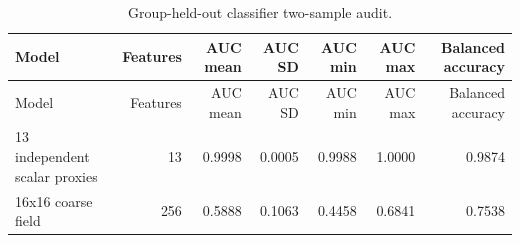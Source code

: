 \scriptsize
\setlength{\tabcolsep}{2pt}
\begin{longtable}{p{}rrrrrr}
\caption{Group-held-out classifier two-sample audit.}\label{tab:c2st}\\
\toprule
Model & Features & AUC mean & AUC SD & AUC min & AUC max & Balanced accuracy\\
\midrule
\endfirsthead\toprule
Model & Features & AUC mean & AUC SD & AUC min & AUC max & Balanced accuracy\\
\midrule\endhead
13 independent scalar proxies & 13 & 0.9998 & 0.0005 & 0.9988 & 1.0000 & 0.9874\\
16x16 coarse field & 256 & 0.5888 & 0.1063 & 0.4458 & 0.6841 & 0.7538\\
\bottomrule
\end{longtable}
\normalsize
\setlength{\tabcolsep}{6pt}
